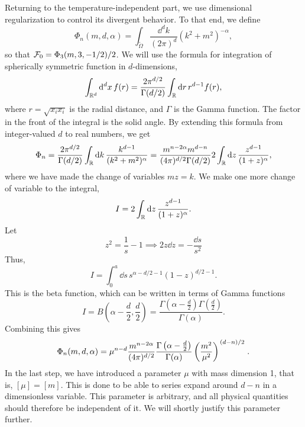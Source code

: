 Returning to the temperature-independent part, we use dimensional regularization to control its divergent behavior.
To that end, we define
\begin{equation}
    \label{def dimreg integral}
    \Phi_n(m, d, \alpha) 
    = \int_{\tilde \Omega} \frac{\dd^d k}{(2 \pi)^d} (k^2 + m^2)^{-\alpha},
\end{equation}
so that $\mathcal{F}_0 = \Phi_3(m, 3, -1/2) / 2$.
We will use the formula for integration of spherically symmetric function in $d$-dimensions,
\begin{equation}
    \int_{\mathbb{R}^d} \dd^d x \, f(r) 
    = \frac{2 \pi^{d/2}}{\Gamma(d/2)} \int_{\mathbb{R}} \dd r \, r^{d-1}f(r),
\end{equation}
where $r = \sqrt{x_i x_i}$ is the radial distance, and $\Gamma$ is the Gamma function.
The factor in the front of the integral is the solid angle.
By extending this formula from integer-valued $d$ to real numbers, we get
\begin{equation}
    \Phi_n
    = \frac{2 \pi^{d/2} }{\Gamma(d/2)} \int_{\mathbb{R}} \dd k \, 
    \frac{k^{d-1}}{(k^2 + m^2)^\alpha}
    = \frac{m^{n-2\alpha}m^{d-n} }{(4 \pi)^{d / 2}\Gamma(d/2)} 
    2 \int_{\mathbb{R}} \dd z \, \frac{z^{d - 1}}{(1 + z)^\alpha}, 
\end{equation}
where we have made the change of variables $m z = k$.
We make one more change of variable to the integral,
\begin{equation}
    I = 2 \int_{\mathbb{R}} \dd z \, \frac{z^{d - 1}}{(1 + z)^\alpha}.
\end{equation}
Let
\begin{equation}
    z^2 = \frac{1}{s} - 1 \implies 2 z \dd z = - \frac{\dd s}{s^2}
\end{equation}
Thus,
\begin{equation}
    I = \int_0^a \dd s \, s^{\alpha - d/2 - 1} (1 - z)^{d/2 - 1}.
\end{equation}
This is the beta function, which can be written in terms of Gamma functions~
\begin{equation}
    I = B\left(\alpha - \frac{d}{2}, \frac{d}{2}\right) 
    = \frac{\Gamma\left(\alpha - \frac{d}{2}\right) \Gamma\left(\frac{d}{2}\right)}{\Gamma(\alpha)}.
\end{equation}
Combining this gives
\begin{equation}
    \label{result dimreg}
    \Phi_n(m, d, \alpha) 
    = \mu^{n-d} \frac{m^{n - 2\alpha}}{(4 \pi)^{d / 2}}
    \frac{
        \Gamma \left(\alpha - \frac{d}{2} \right) 
    }
    {\Gamma(\alpha)}
    \left(\frac{m^2}{\mu^2}\right)^{\flatfrac{(d-n)}{2}} 
    .
\end{equation}
In the last step, we have introduced a parameter $\mu$ with mass dimension 1, that is, $[\mu] = [m]$.
This is done to be able to series expand around $d - n$ in a dimensionless variable. 
This parameter is arbitrary, and all physical quantities should therefore be independent of it.
We will shortly justify this parameter further.


